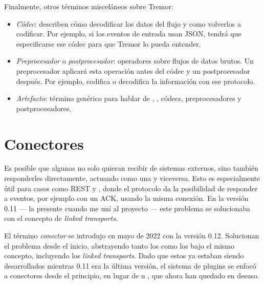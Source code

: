 Finalmente, otros términos misceláneos sobre Tremor:

\begin{itemize}
    \item \emph{Códec}: describen cómo decodificar los datos del flujo y como
        volverlos a codificar. Por ejemplo, si los eventos de entrada usan JSON,
        tendrá que especificarse ese códec para que Tremor lo pueda entender.

    \item \emph{Preprocesador} o \emph{postprocesador}: operadores sobre flujos
        de datos brutos. Un preprocesador aplicará esta operación antes del
        códec y un postprocesador después. Por ejemplo,  codifica o
        decodifica la información con ese protocolo.

    \item \emph{Artefacto}: término genérico para hablar de \sinks, \sources,
        códecs, preprocesadores y postprocesadores.

\end{itemize}

\section{Conectores}

Es posible que algunas \onramps no solo quieran recibir de sistemas externos,
sino también responderles directamente, actuando como una \offramp y viceversa.
Esto es especialmente útil para casos como REST y \websockets, donde el
protocolo da la posibilidad de responder a eventos, por ejemplo con un ACK,
usando la misma conexión. En la versión 0.11 --- la presente cuando me uní al
proyecto --- este problema se solucionaba con el concepto de \emph{linked
transports}.

El término \emph{conector} se introdujo en mayo de 2022 con la versión 0.12.
Solucionan el problema desde el inicio, abstrayendo tanto los \onramps como los
\offramps bajo el mismo concepto, incluyendo los \emph{linked transports}. Dado
que estos ya estaban siendo desarrollados mientras 0.11 era la última versión,
el sistema de plugins se enfocó a conectores desde el principio, en lugar de
\onramps u \offramps, que ahora han quedado en desuso.
